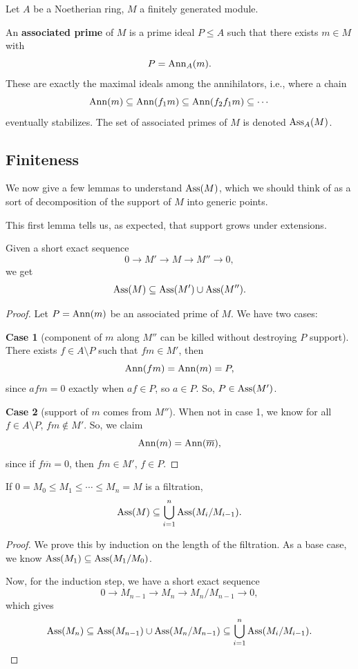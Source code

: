 \documentclass[12pt]{article}
\begin{document}
Let $A$ be a Noetherian ring, $M$ a finitely generated module.

\begin{defn}
    An \textbf{associated prime} of $M$ is a prime ideal $P\leq A$ such that there exists $m\in M$ with
    \[P = \mathrm{Ann}_A(m).\]
    These are exactly the maximal ideals among the annihilators, i.e., where a chain
    \[\mathrm{Ann}(m) \subseteq \mathrm{Ann}(f_1m) \subseteq \mathrm{Ann}(f_2f_1m) \subseteq \cdots\]
    eventually stabilizes. The set of associated primes of $M$ is denoted $\operatorname{Ass}_A(M)$.
\end{defn}

\subsection{Finiteness}
We now give a few lemmas to understand $\operatorname{Ass}(M)$, which we should think of as a sort of decomposition of the support of $M$ into generic points.

This first lemma tells us, as expected, that support grows under extensions.

\begin{prop}
    Given a short exact sequence
    \[0 \to M' \to M \to M'' \to 0,\]
    we get
    \[\operatorname{Ass}(M) \subseteq \operatorname{Ass}(M')\cup \operatorname{Ass}(M'').\]
\end{prop}
\begin{proof}
    Let $P=\mathrm{Ann}(m)$ be an associated prime of $M$. We have two cases:
    
    \textbf{Case 1} (component of $m$ along $M''$ can be killed without destroying $P$ support). There exists $f\in A\setminus P$ such that $fm\in M'$, then
    \[\mathrm{Ann}(fm) = \mathrm{Ann}(m) = P,\]
    since $afm=0$ exactly when $af\in P$, so $a\in P$. So, $P\in \operatorname{Ass}(M')$.
    
    \textbf{Case 2} (support of $m$ comes from $M''$). When not in case 1, we know for all $f\in A\setminus P$, $fm\not\in M'$. So, we claim
    \[\mathrm{Ann}(m) = \mathrm{Ann}(\overline{m}),\]
    since if $f\overline{m}=0$, then $fm\in M'$, $f\in P$.
\end{proof}

\begin{cor}
    If $0=M_0\leq M_1 \leq \cdots \leq M_n = M$ is a filtration,
    \[\operatorname{Ass}(M) \subseteq \bigcup_{i=1}^n \operatorname{Ass}(M_i/M_{i-1}).\]
\end{cor}
\begin{proof}
    We prove this by induction on the length of the filtration. As a base case, we know $\operatorname{Ass}(M_1) \subseteq \operatorname{Ass}(M_1/M_0)$.

    Now, for the induction step, we have a short exact sequence
    \[0 \to M_{n-1} \to M_n \to M_n/M_{n-1} \to 0,\]
    which gives
    \[\operatorname{Ass}(M_n) \subseteq \operatorname{Ass}(M_{n-1}) \cup \operatorname{Ass}(M_n/M_{n-1}) \subseteq \bigcup_{i=1}^n \operatorname{Ass}(M_i/M_{i-1}).\]
\end{proof}
\end{document}
